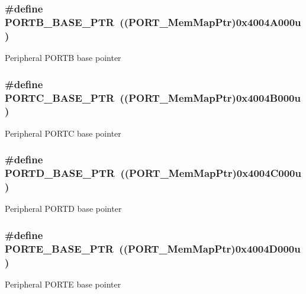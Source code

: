 \subsubsection[{P\+O\+R\+T\+B\+\_\+\+B\+A\+S\+E\+\_\+\+P\+T\+R}]{\setlength{\rightskip}{0pt plus 5cm}\#define P\+O\+R\+T\+B\+\_\+\+B\+A\+S\+E\+\_\+\+P\+T\+R~(({\bf P\+O\+R\+T\+\_\+\+Mem\+Map\+Ptr})0x4004\+A000u)}\label{group___p_o_r_t___peripheral_ga585b4782d1ceb44492289af0019480f9}
Peripheral P\+O\+R\+T\+B base pointer \hypertarget{group___p_o_r_t___peripheral_ga03c740cdda17711afafc932723871474}{}
\subsubsection[{P\+O\+R\+T\+C\+\_\+\+B\+A\+S\+E\+\_\+\+P\+T\+R}]{\setlength{\rightskip}{0pt plus 5cm}\#define P\+O\+R\+T\+C\+\_\+\+B\+A\+S\+E\+\_\+\+P\+T\+R~(({\bf P\+O\+R\+T\+\_\+\+Mem\+Map\+Ptr})0x4004\+B000u)}\label{group___p_o_r_t___peripheral_ga03c740cdda17711afafc932723871474}
Peripheral P\+O\+R\+T\+C base pointer \hypertarget{group___p_o_r_t___peripheral_ga7f5a263751543810ebfdbde278383276}{}
\subsubsection[{P\+O\+R\+T\+D\+\_\+\+B\+A\+S\+E\+\_\+\+P\+T\+R}]{\setlength{\rightskip}{0pt plus 5cm}\#define P\+O\+R\+T\+D\+\_\+\+B\+A\+S\+E\+\_\+\+P\+T\+R~(({\bf P\+O\+R\+T\+\_\+\+Mem\+Map\+Ptr})0x4004\+C000u)}\label{group___p_o_r_t___peripheral_ga7f5a263751543810ebfdbde278383276}
Peripheral P\+O\+R\+T\+D base pointer \hypertarget{group___p_o_r_t___peripheral_gab166fe285bbb15b52de610f408fe25d3}{}
\subsubsection[{P\+O\+R\+T\+E\+\_\+\+B\+A\+S\+E\+\_\+\+P\+T\+R}]{\setlength{\rightskip}{0pt plus 5cm}\#define P\+O\+R\+T\+E\+\_\+\+B\+A\+S\+E\+\_\+\+P\+T\+R~(({\bf P\+O\+R\+T\+\_\+\+Mem\+Map\+Ptr})0x4004\+D000u)}\label{group___p_o_r_t___peripheral_gab166fe285bbb15b52de610f408fe25d3}
Peripheral P\+O\+R\+T\+E base pointer 

